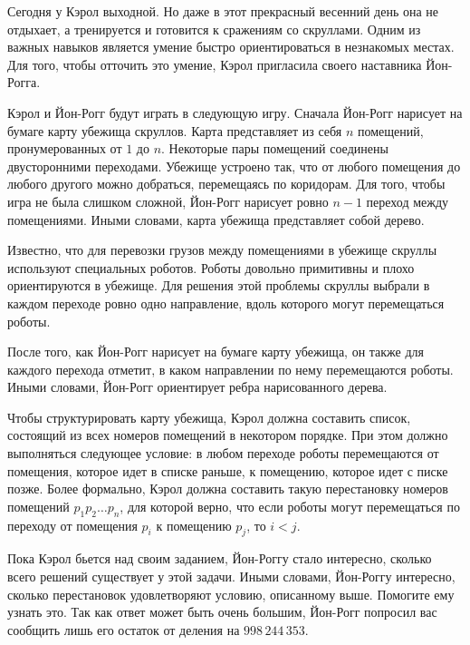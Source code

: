 Сегодня у Кэрол выходной. Но даже в этот прекрасный весенний день она не отдыхает, а тренируется и готовится к сражениям со скруллами. Одним из важных навыков является умение быстро ориентироваться в незнакомых местах. Для того, чтобы отточить это умение, Кэрол пригласила своего наставника Йон-Рогга.

Кэрол и Йон-Рогг будут играть в следующую игру. Сначала Йон-Рогг нарисует на бумаге карту убежища скруллов. Карта представляет из себя $n$ помещений, пронумерованных от $1$ до $n$. Некоторые пары помещений соединены двусторонними переходами. Убежище устроено так, что от любого помещения до любого другого можно добраться, перемещаясь по коридорам. Для того, чтобы игра не была слишком сложной, Йон-Рогг нарисует ровно $n - 1$ переход между помещениями. Иными словами, карта убежища представляет собой дерево.

Известно, что для перевозки грузов между помещениями в убежище скруллы используют специальных роботов. Роботы довольно примитивны и плохо ориентируются в убежище. Для решения этой проблемы скруллы выбрали в каждом переходе ровно одно направление, вдоль которого могут перемещаться роботы.

После того, как Йон-Рогг нарисует на бумаге карту убежища, он также для каждого перехода отметит, в каком направлении по нему перемещаются роботы. Иными словами, Йон-Рогг ориентирует ребра нарисованного дерева.

Чтобы структурировать карту убежища, Кэрол должна составить список, состоящий из всех номеров помещений в некотором порядке. При этом должно выполняться следующее условие: в любом переходе роботы перемещаются от помещения, которое идет в списке раньше, к помещению, которое идет с писке позже. Более формально, Кэрол должна составить такую перестановку номеров помещений $p_1 p_2 \ldots p_n$, для которой верно, что если роботы могут перемещаться по переходу от помещения $p_i$ к помещению $p_j$, то $i < j$.

Пока Кэрол бьется над своим заданием, Йон-Роггу стало интересно, сколько всего решений существует у этой задачи. Иными словами, Йон-Роггу интересно, сколько перестановок удовлетворяют условию, описанному выше. Помогите ему узнать это. Так как ответ может быть очень большим, Йон-Рогг попросил вас сообщить лишь его остаток от деления на $998\,244\,353$.